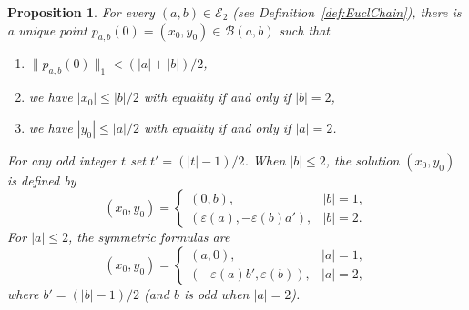 \documentclass[12pt,letterpaper]{article}
\numberwithin{equation}{section}
\newcommand{\B}{\mathcal B}
\newcommand{\E}{\mathcal E}
\newcommand{\eps}{\varepsilon}
\newcommand{\normone}[1]{\lVert #1\rVert_1}
\theoremstyle{plain}
\newtheorem{proposition}[theorem]{Proposition}
\theoremstyle{definition}
\begin{document}
\begin{proposition}\label{prop:p0}
For every $(a,b)\in\E_2$ (see Definition~\ref{def:EuclChain}), there is a unique point $p_{a,b}(0)=(x_0,y_0)\in\B(a,b)$ such that
\begin{enumerate}
  \item[\emph{(a)}] $\normone{p_{a,b}(0)}<(|a|+|b|)/2$,
  \item[\emph{(b)}] we have $|x_0|\le|b|/2$ with equality if and only if $|b|=2$,
  \item[\emph{(c)}] we have $|y_0|\le|a|/2$ with equality if and only if $|a|=2$.
\end{enumerate}
For any odd integer $t$ set $t'=(|t|-1)/2$. When $|b|\le2$, the solution $(x_0,y_0)$ is defined by
\begin{equation}\label{eq:x0y0}
 (x_0,y_0)=
 \begin{cases}
   (0,b),               &|b|=1,\\
   (\eps(a),-\eps(b)a'),&|b|=2.
 \end{cases}
\end{equation}
For $|a|\le2$, the symmetric formulas are
\begin{equation}\label{eq:x0y0-symmetric}
 (x_0,y_0)=
 \begin{cases}
  (a,0),&|a|=1,\\
  (-\eps(a)b',\eps(b)),&|a|=2,
 \end{cases}
\end{equation}
where $b'=(|b|-1)/2$ (and $b$ is odd when $|a|=2$).
\end{proposition}
\end{document}
